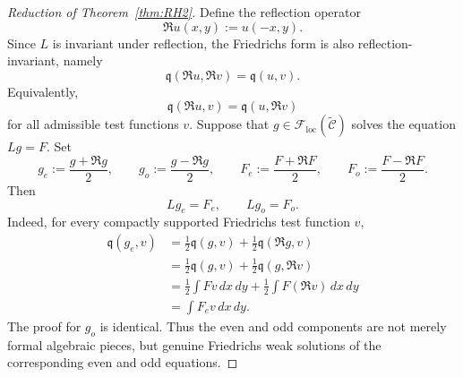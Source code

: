 \documentclass[12pt]{amsart}
\begin{document}
\begin{proof}[Reduction of Theorem~\ref{thm:RH2}]
Define the reflection operator
\begin{equation*}
    \mathfrak Ru(x,y):= u(-x,y).
\end{equation*}
Since $L$ is invariant under reflection, the Friedrichs form is also reflection-invariant, namely
\begin{equation*}
    \mathfrak q(\mathfrak Ru,\mathfrak Rv) = \mathfrak q(u,v).
\end{equation*}
Equivalently,
\begin{equation*}
    \mathfrak q(\mathfrak Ru,v) = \mathfrak q(u,\mathfrak Rv)
\end{equation*}
for all admissible test functions $v$. Suppose that $g\in \mathcal{F}_{\mathrm{loc}}(\widetilde{\mathcal{C}})$ solves the equation $Lg=F$. Set
\begin{equation*}
    g_e:= \frac{g+\mathfrak Rg}{2},\qquad g_o:=\frac{g-\mathfrak Rg}{2},\qquad F_e:=\frac{F+\mathfrak RF}{2},\qquad F_o:=\frac{F-\mathfrak RF}{2}.
\end{equation*}
Then
\begin{equation*}
    Lg_e=F_e,\qquad L g_o = F_o.
\end{equation*}
Indeed, for every compactly supported Friedrichs test function $v$,
\begin{align*}
    \mathfrak q(g_e,v)
    &= \frac{1}{2} \mathfrak q(g,v) + \frac{1}{2} \mathfrak q(\mathfrak R g,v)\\
    &= \frac{1}{2} \mathfrak q(g,v) + \frac{1}{2} \mathfrak q(g,\mathfrak Rv)\\
    &= \frac{1}{2} \int F v \, dx\,dy  + \frac{1}{2} \int F (\mathfrak Rv) \, dx\,dy\\
    &= \int F_e v \, dx\,dy.
\end{align*}
The proof for $g_o$ is identical. Thus the even and odd components are not merely formal algebraic pieces, but genuine Friedrichs weak solutions of the corresponding even and odd equations.


\end{proof}
\end{document}
